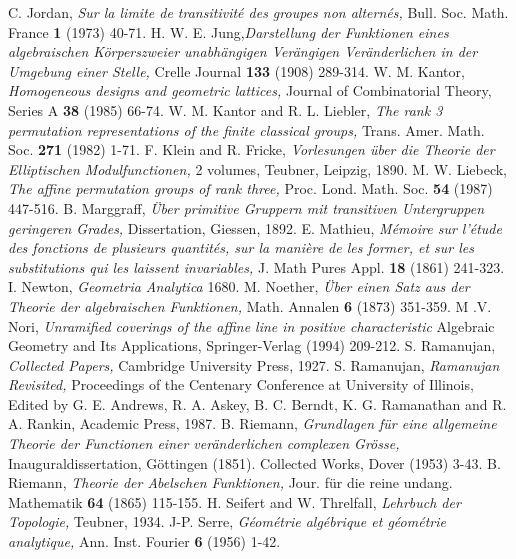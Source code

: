 \begin{thebibliography}{99}
 C. Jordan, \textit{Sur la limite de transitivit\'e des groupes non altern\'es,} Bull. Soc. Math. France {\bf 1} (1973) 40-71.
 H. W. E. Jung,\textit{Darstellung der Funktionen eines algebraischen K\"orperszweier unabh\"angigen Ver\"angigen Ver\"anderlichen in der Umgebung einer Stelle,} Crelle Journal {\bf 133} (1908) 289-314.
 W. M. Kantor, \textit{Homogeneous designs and geometric lattices,} Journal of Combinatorial Theory, Series A {\bf 38} (1985) 66-74.
 W. M. Kantor and R. L. Liebler, \textit{The rank  3 permutation representations of the finite classical groups,} Trans. Amer. Math. Soc. {\bf 271} (1982) 1-71.
 F. Klein and R. Fricke, \textit{Vorlesungen \"uber die Theorie der Elliptischen Modulfunctionen,} 2 volumes, Teubner, Leipzig, 1890.
 M. W. Liebeck, \textit{The affine permutation groups of rank three,} Proc. Lond. Math. Soc. {\bf 54} (1987) 447-516.
 B. Marggraff, \textit{\"Uber primitive Gruppern mit transitiven Untergruppen geringeren Grades,} Dissertation, Giessen, 1892.
 E. Mathieu, \textit{M\'emoire sur l'\'etude des fonctions de plusieurs quantit\'es, sur la mani\`ere de les former, et sur les substitutions qui les laissent invariables,} J. Math Pures Appl. {\bf 18} (1861) 241-323.
 I. Newton, \textit{Geometria Analytica} 1680.
 M. Noether, \textit{\"Uber einen Satz aus der Theorie der algebraischen Funktionen,} Math. Annalen {\bf 6} (1873) 351-359.
 M .V. Nori, \textit{Unramified coverings of the affine line in positive characteristic} Algebraic Geometry and Its Applications, Springer-Verlag (1994) 209-212.
 S. Ramanujan, \textit{Collected Papers,} Cambridge University Press, 1927.
 S. Ramanujan, \textit{Ramanujan Revisited,} Proceedings of the Centenary Conference at University of Illinois, Edited by G. E. Andrews, R. A. Askey, B. C. Berndt, K. G. Ramanathan and R. A. Rankin, Academic Press, 1987.
 B. Riemann, \textit{Grundlagen f\"ur eine allgemeine Theorie der Functionen einer ver\"anderlichen complexen Gr\"osse,} Inauguraldissertation, G\"ottingen (1851). Collected Works, Dover (1953) 3-43.
 B. Riemann, \textit{Theorie der Abelschen Funktionen,} Jour. f\"ur die reine undang. Mathematik {\bf 64} (1865) 115-155.
 H. Seifert and W. Threlfall, \textit{Lehrbuch der Topologie,} Teubner, 1934.
 J-P. Serre, \textit{G\'eom\'etrie alg\'ebrique et g\'eom\'etrie analytique,} Ann. Inst. Fourier {\bf 6} (1956) 1-42.

\end{thebibliography}
